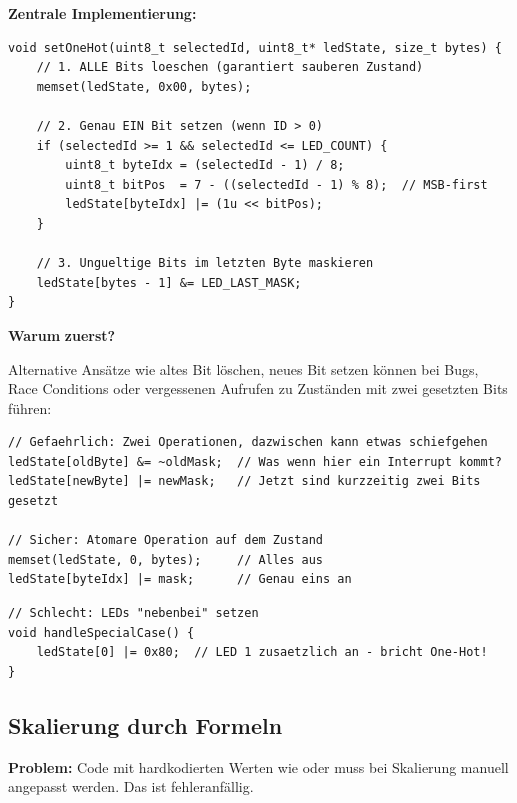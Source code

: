 \textbf{Zentrale Implementierung:}

\begin{lstlisting}[style=arduino]
void setOneHot(uint8_t selectedId, uint8_t* ledState, size_t bytes) {
    // 1. ALLE Bits loeschen (garantiert sauberen Zustand)
    memset(ledState, 0x00, bytes);

    // 2. Genau EIN Bit setzen (wenn ID > 0)
    if (selectedId >= 1 && selectedId <= LED_COUNT) {
        uint8_t byteIdx = (selectedId - 1) / 8;
        uint8_t bitPos  = 7 - ((selectedId - 1) % 8);  // MSB-first
        ledState[byteIdx] |= (1u << bitPos);
    }

    // 3. Ungueltige Bits im letzten Byte maskieren
    ledState[bytes - 1] &= LED_LAST_MASK;
}
\end{lstlisting}

\textbf{Warum}  \textbf{zuerst?}

Alternative Ansätze wie \glqq altes Bit löschen, neues Bit setzen\grqq{} können bei Bugs, Race Conditions oder vergessenen Aufrufen zu Zuständen mit zwei gesetzten Bits führen:

\begin{lstlisting}[style=arduino]
// Gefaehrlich: Zwei Operationen, dazwischen kann etwas schiefgehen
ledState[oldByte] &= ~oldMask;  // Was wenn hier ein Interrupt kommt?
ledState[newByte] |= newMask;   // Jetzt sind kurzzeitig zwei Bits gesetzt

// Sicher: Atomare Operation auf dem Zustand
memset(ledState, 0, bytes);     // Alles aus
ledState[byteIdx] |= mask;      // Genau eins an
\end{lstlisting}

\begin{warnbox}[Verboten]
\begin{lstlisting}[style=arduino,numbers=none]
// Schlecht: LEDs "nebenbei" setzen
void handleSpecialCase() {
    ledState[0] |= 0x80;  // LED 1 zusaetzlich an - bricht One-Hot!
}
\end{lstlisting}
\end{warnbox}

\subsection{Skalierung durch Formeln}

\textbf{Problem:} Code mit hardkodierten Werten wie  oder  muss bei Skalierung manuell angepasst werden. Das ist fehleranfällig.

